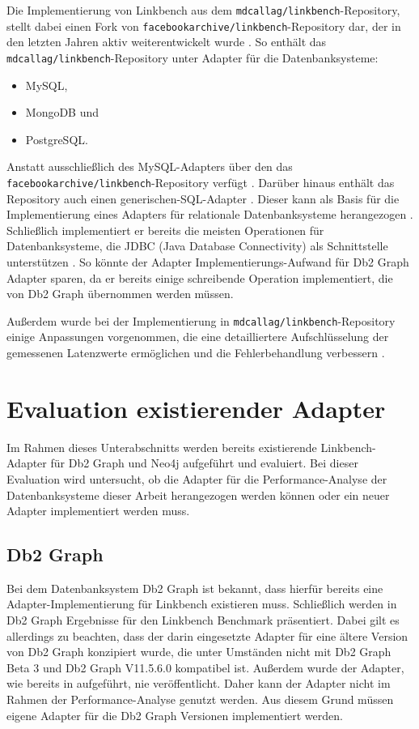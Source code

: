 Die Implementierung von Linkbench aus dem \texttt{mdcallag/linkbench}-Repository, stellt dabei einen Fork von \texttt{facebookarchive\allowbreak /linkbench}-Repository dar, der in den letzten Jahren aktiv weiterentwickelt wurde \cite{mc_linkbench_github}. So enthält das \texttt{mdcallag/linkbench}-Repository unter \cite{mc_linkbench_github} Adapter für die Datenbanksysteme: 
\begin{itemize}
    \item MySQL,
    \item MongoDB und
    \item PostgreSQL.
\end{itemize}
Anstatt ausschließlich des MySQL-Adapters über den das \texttt{facebookarchive/\break linkbench}-Repository verfügt \cite{mc_linkbench_github}. Darüber hinaus enthält das Repository auch einen generischen-SQL-Adapter \cite{mc_linkbench_github}. Dieser kann als Basis für die Implementierung eines Adapters für relationale Datenbanksysteme herangezogen \cite{mc_linkbench_github}. Schließlich implementiert er bereits die meisten Operationen für Datenbanksysteme, die JDBC (Java Database Connectivity) als Schnittstelle unterstützen \cite{mc_linkbench_github}. So könnte der Adapter Implementierungs-Aufwand für Db2 Graph Adapter sparen, da er bereits einige schreibende Operation implementiert, die von Db2 Graph übernommen werden müssen.

Außerdem wurde bei der Implementierung in \texttt{mdcallag/linkbench}-Repository einige Anpassungen vorgenommen, die eine detailliertere Aufschlüsselung der gemessenen Latenzwerte ermöglichen und die Fehlerbehandlung verbessern \cite{mc_linkbench_github}.

\section{Evaluation existierender Adapter}
\label{implementierung:evaluation}
Im Rahmen dieses Unterabschnitts werden bereits existierende Linkbench-Adapter für Db2 Graph und Neo4j aufgeführt und evaluiert. Bei dieser Evaluation wird untersucht, ob die Adapter für die Performance-Analyse der Datenbanksysteme dieser Arbeit herangezogen werden können oder ein neuer Adapter implementiert werden muss. 

\subsection{Db2 Graph}
Bei dem Datenbanksystem Db2 Graph ist bekannt, dass hierfür bereits eine Adapter-Implementierung für Linkbench existieren muss. Schließlich werden in \cite{sigmod_tian} Db2 Graph Ergebnisse für den Linkbench Benchmark präsentiert. Dabei gilt es allerdings zu beachten, dass der darin eingesetzte Adapter für eine ältere Version von Db2 Graph konzipiert wurde, die unter Umständen nicht mit Db2 Graph Beta 3 und Db2 Graph V11.5.6.0 kompatibel ist. Außerdem wurde der Adapter, wie bereits in  aufgeführt, nie veröffentlicht. Daher kann der Adapter nicht im Rahmen der Performance-Analyse genutzt werden. Aus diesem Grund müssen eigene Adapter für die Db2 Graph Versionen implementiert werden. 

